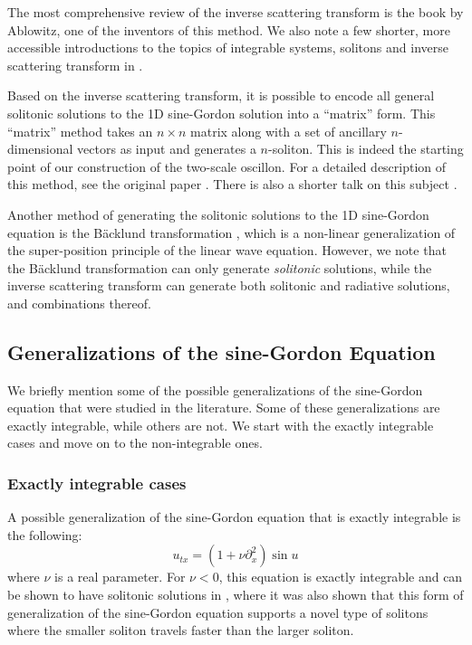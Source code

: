 \documentclass{report}
\begin{document}
The most comprehensive review of the inverse scattering transform is the book \cite{ablowitz} by Ablowitz, one of the inventors of this method. We also note a few shorter, more accessible introductions to the topics of integrable systems, solitons and inverse scattering transform in \cite{Aktosun2009, spiro, intsys}.

Based on the inverse scattering transform, it is possible to encode all general solitonic solutions to the 1D sine-Gordon solution into a ``matrix'' form. This ``matrix'' method takes an $n\times n$ matrix along with a set of ancillary $n$-dimensional vectors as input and generates a $n$-soliton. This is indeed the starting point of our construction of the two-scale oscillon. For a detailed description of this method, see the original paper \cite{:/content/aip/journal/jmp/51/12/10.1063/1.3520596}. There is also a shorter talk on this subject \cite{sgtalk}.

Another method of generating the solitonic solutions to the 1D sine-Gordon equation is the B\"acklund transformation \cite{Dodd499, hietarinta1997introduction, Cuenda20111047}, which is a non-linear generalization of the super-position principle of the linear wave equation. However, we note that the B\"acklund transformation can only generate \emph{solitonic} solutions, while the inverse scattering transform can generate both solitonic and radiative solutions, and combinations thereof.

\subsection{Generalizations of the sine-Gordon Equation}
We briefly mention some of the possible generalizations of the sine-Gordon equation that were studied in the literature. Some of these generalizations are exactly integrable, while others are not. We start with the exactly integrable cases and move on to the non-integrable ones.

\subsubsection{Exactly integrable cases}
A possible generalization of the sine-Gordon equation that is exactly integrable \cite{1751-8121-43-10-105204} is the following:
\begin{equation}
  u_{tx} = (1+\nu \partial^2_x)\sin u
\end{equation}
where $\nu$ is a real parameter. For $\nu<0$, this equation is exactly integrable and can be shown to have solitonic solutions in \cite{1751-8121-43-10-105204}, where it was also shown that this form of generalization of the sine-Gordon equation supports a novel type of solitons where the smaller soliton travels faster than the larger soliton.
\end{document}
